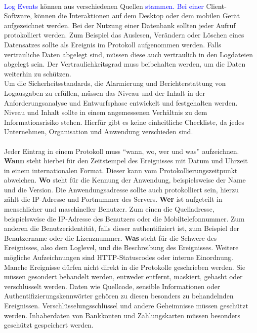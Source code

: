 \\
\textcolor{blue}{
    Log Events} können aus verschiedenen Quellen \textcolor{blue}{stammen.
Bei einer }
Client-Software, können die Interaktionen auf dem Desktop oder dem mobilen Gerät aufgezeichnet werden.
Bei der Nutzung einer Datenbank sollten jeder Aufruf protokolliert werden.
Zum Beispiel das Auslesen, Verändern oder Löschen eines Datensatzes sollte als Ereignis im Protokoll aufgenommen werden.
Falls vertrauliche Daten abgelegt sind, müssen diese auch vertraulich in den Logdateien abgelegt sein.
Der Vertraulichkeitsgrad muss beibehalten werden, um die Daten weiterhin zu schützen.
\\
Um die Sicherheitsstandards, die Alarmierung und Berichterstattung von Logausgaben zu erfüllen, müssen das Niveau und der Inhalt in der Anforderungsanalyse und Entwurfsphase entwickelt und festgehalten werden.
Niveau und Inhalt sollte in einem angemessenen Verhältnis zu dem Informationsrisiko stehen.
Hierfür gibt es keine einheitliche Checkliste, da jedes Unternehmen, Organisation und Anwendung verschieden sind.\autocite{owasp}
\\
\\
Jeder Eintrag in einem Protokoll muss \enquote{wann, wo, wer und was} aufzeichnen.
\textbf{Wann} steht hierbei für den Zeitstempel des Ereignisses mit Datum und Uhrzeit in einem internationalen Format.
Dieser kann vom Protokollierungszeitpunkt abweichen.
\textbf{Wo} steht für die Kennung der Anwendung, beispielsweise der Name und die Version.
Die Anwendungsadresse sollte auch protokolliert sein, hierzu zählt die IP-Adresse und Portnummer des Servers.
\textbf{Wer} ist aufgeteilt in menschlicher und maschineller Benutzer.
Zum einen die Quelladresse, beispielsweise die IP-Adresse des Benutzers oder die Mobiltelefonnummer.
Zum anderen die Benutzeridentität, falls dieser authentifiziert ist, zum Beispiel der Benutzername oder die Lizenznummer.
\textbf{Was} steht für die Schwere des Ereignisses, also dem Loglevel, und die Beschreibung des Ereignisses.
Weitere mögliche Aufzeichnungen sind HTTP-Statuscodes oder interne Einordnung.
\\
Manche Ereignisse dürfen nicht direkt in die Protokolle geschrieben werden.
Sie müssen gesondert behandelt werden, entweder entfernt, maskiert, gehasht oder verschlüsselt werden.
Daten wie Quellcode, sensible Informationen oder Authentifizierungskennwörter gehören zu diesen besonders zu behandelnden Ereignissen.
Verschlüsselungsschlüssel und andere Geheimnisse müssen geschützt werden.
Inhaberdaten von Bankkonten und Zahlungskarten müssen besonders geschützt gespeichert werden.
